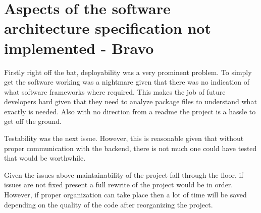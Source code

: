 \documentclass[english]{article}
\begin{document}
\section{Aspects of the software architecture specification not implemented - Bravo}
Firstly right off the bat, deployability was a very prominent problem. To simply get the software working was a nightmare given that there was no indication of what software frameworks where required. This makes the job of future developers hard given that they need to analyze package files to understand what exactly is needed. Also with no direction from a readme the project is a hassle to get off the ground.

Testability was the next issue. However, this is reasonable given that without proper communication with the backend, there is not much one could have tested that would be worthwhile.

Given the issues above maintainability of the project fall through the floor, if issues are not fixed present a full rewrite of the project would be in order. However, if proper organization can take place then a lot of time will be saved depending on the quality of the code after reorganizing the project.


	
\end{document}
